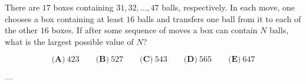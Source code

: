 There are \(17\) boxes containing \(31,32,\ldots,47\) balls, respectively. In each move, one chooses a box containing at least \(16\) balls and transfers one ball from it to each of the other \(16\) boxes. If after some sequence of moves a box can contain \(N\) balls, what is the largest possible value of \(N\)?



\[
\textbf{(A)}\ 423
\qquad
\textbf{(B)}\ 527
\qquad
\textbf{(C)}\ 543
\qquad
\textbf{(D)}\ 565
\qquad
\textbf{(E)}\ 647
\]

---
